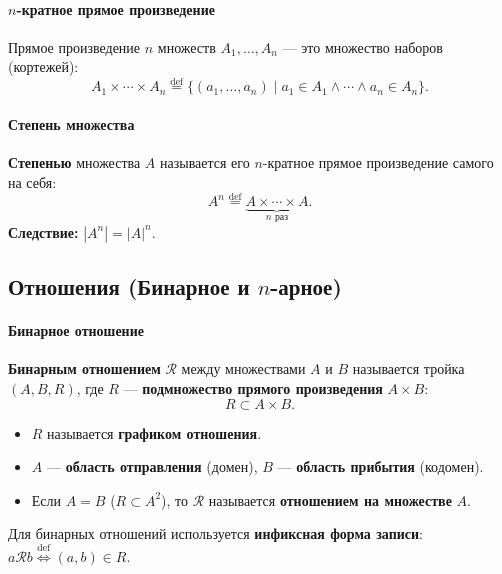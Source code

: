 \paragraph{$n$-кратное прямое произведение}
Прямое произведение $n$ множеств $A_1, \ldots, A_n$ --- это множество наборов (кортежей):
$$A_1 \times \cdots \times A_n \stackrel{\text{def}}{=} \{(a_1, \ldots, a_n) \mid a_1 \in A_1 \land \cdots \land a_n \in A_n\}.$$

\paragraph{Степень множества}
\textbf{Степенью} множества $A$ называется его $n$-кратное прямое произведение самого на себя:
$$A^n \stackrel{\text{def}}{=} \underbrace{A \times \cdots \times A}_{n \text{ раз}}.$$
\textbf{Следствие:} $|A^n| = |A|^n$.

\subsection*{Отношения (Бинарное и $n$-арное)}

\paragraph{Бинарное отношение}
\textbf{Бинарным отношением} $\mathcal{R}$ между множествами $A$ и $B$ называется тройка $(A, B, R)$, где $R$ --- \textbf{подмножество прямого произведения} $A \times B$:
$$R \subset A \times B.$$
\begin{itemize}
    \item $R$ называется \textbf{графиком отношения}.
    \item $A$ --- \textbf{область отправления} (домен), $B$ --- \textbf{область прибытия} (кодомен).
    \item Если $A = B$ ($R \subset A^2$), то $\mathcal{R}$ называется \textbf{отношением на множестве} $A$.
\end{itemize}
Для бинарных отношений используется \textbf{инфиксная форма записи}: $a \mathcal{R} b \stackrel{\text{def}}{\iff} (a, b) \in R$.

